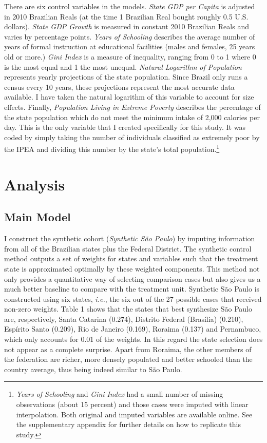 There are six control variables in the models. \emph{State GDP per Capita} is adjusted in 2010 Brazilian Reals (at the time 1 Brazilian Real bought roughly 0.5 U.S. dollars). \emph{State GDP Growth} is measured in constant 2010 Brazilian Reals and varies by percentage points. \emph{Years of Schooling} describes the average number of years of formal instruction at educational facilities (males and females, 25 years old or more.) \emph{Gini Index} is a measure of inequality, ranging from 0 to 1 where 0 is the most equal and 1 the most unequal. \emph{Natural Logarithm of Population} represents yearly projections of the state population. Since Brazil only runs a census every 10 years, these projections represent the most accurate data available. I have taken the natural logarithm of this variable to account for size effects. Finally, \emph{Population Living in Extreme Poverty} describes the percentage of the state population which do not meet the minimum intake of 2,000 calories per day. This is the only variable that I created specifically for this study. It was coded by simply taking the number of individuals classified as extremely poor by the IPEA and dividing this number by the state's total population.\footnote{\emph{Years of Schooling} and \emph{Gini Index} had a small number of missing observations (about 15 percent) and those cases were imputed with linear interpolation. Both original and imputed variables are available online. See the supplementary appendix for further details on how to replicate this study.} 

\section{Analysis}
\label{sec:analysis}

\subsection{Main Model}

I construct the synthetic cohort (\emph{Synthetic São Paulo}) by imputing information from all of the Brazilian states plus the Federal District. The synthetic control method outputs a set of weights for states and variables such that the treatment state is approximated optimally by these weighted components. This method not only provides a quantitative way of selecting comparison cases but also gives us a much better baseline to compare with the treatment unit. Synthetic São Paulo is constructed using six states, \emph{i.e.}, the six out of the 27 possible cases that received non-zero weights. Table 1 shows that the states that best synthesize São Paulo are, respectively, Santa Catarina (0.274), Distrito Federal (Brasília) (0.210), Espírito Santo (0.209), Rio de Janeiro (0.169), Roraima (0.137) and Pernambuco, which only accounts for 0.01 of the weights. In this regard the state selection does not appear as a complete surprise. Apart from Roraima, the other members of the federation are richer, more densely populated and better schooled than the country average, thus being indeed similar to São Paulo.

